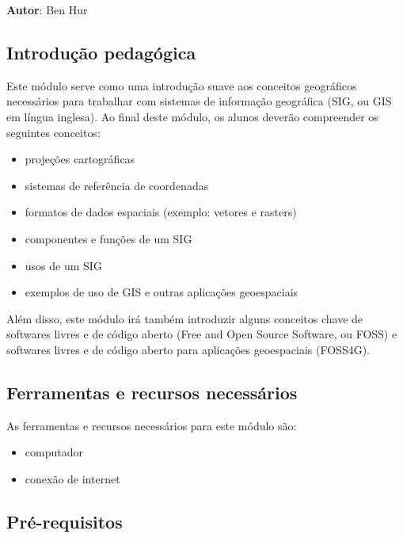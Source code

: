 \documentclass[
  portuguese,
]{krantz}
\providecommand{\tightlist}{%
  \setlength{\itemsep}{0pt}\setlength{\parskip}{0pt}}
\begin{document}
\textbf{Autor}: Ben Hur

\hypertarget{introduuxe7uxe3o-pedaguxf3gica}{%
\subsection{Introdução pedagógica}\label{introduuxe7uxe3o-pedaguxf3gica}}

Este módulo serve como uma introdução suave aos conceitos geográficos necessários para trabalhar com sistemas de informação geográfica (SIG, ou GIS em língua inglesa). Ao final deste módulo, os alunos deverão compreender os seguintes conceitos:

\begin{itemize}
\tightlist
\item
  projeções cartográficas
\item
  sistemas de referência de coordenadas
\item
  formatos de dados espaciais (exemplo: vetores e rasters)
\item
  componentes e funções de um SIG
\item
  usos de um SIG
\item
  exemplos de uso de GIS e outras aplicações geoespaciais
\end{itemize}

Além disso, este módulo irá também introduzir alguns conceitos chave de softwares livres e de código aberto (Free and Open Source Software, ou FOSS) e softwares livres e de código aberto para aplicações geoespaciais (FOSS4G).

\hypertarget{ferramentas-e-recursos-necessuxe1rios}{%
\subsection{Ferramentas e recursos necessários}\label{ferramentas-e-recursos-necessuxe1rios}}

As ferramentas e recursos necessários para este módulo são:

\begin{itemize}
\tightlist
\item
  computador
\item
  conexão de internet
\end{itemize}

\hypertarget{pruxe9-requisitos}{%
\subsection{Pré-requisitos}\label{pruxe9-requisitos}}
\end{document}
